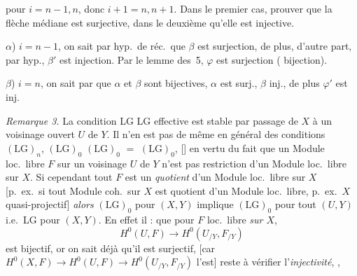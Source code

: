 \documentclass[11pt,a4paper]{article}
\begin{document}

pour $i = n-1, n$, donc $i+1 = n, n+1$. Dans le premier cas,  \ill{} prouver que la flèche médiane est surjective, dans le deuxième qu'elle est injective.

$\alpha$) $i = n-1$, on sait par hyp.\ de réc.\ que  $\beta$ est surjection,  de plus, d'autre part, par hyp., $\beta'$ est injection. Par le lemme des~5, $\varphi$ est  surjection (\struck{\ill{}} bijection).

$\beta$) $i = n$, on sait par   \ill{} que $\alpha$ et $\beta$ sont bijectives, \ill{} $\alpha$ est surj., $\beta$ inj., de plus $\varphi'$ est inj.

\emph{Remarque 3.} La condition LG \ill{} LG effective est stable par passage de $X$ à un voisinage ouvert $U$ de $Y$. Il n'en est pas de même en général des conditions $(\mathrm{LG})_n$,  $(\mathrm{LG})_0$ \struck{\ill{} \ill{} \ill{} \ill{} \ill{}} \ill{} \ill{} \ill{} \struck{\ill{} \ill{} \ill{}} $(\mathrm{LG})_0$ \ill{}  \ill{} $=$ \ill{} $(\mathrm{LG})_0$, [] en vertu du fait que un Module loc.\ libre $F$ sur un voisinage $U$ de $Y$ n'est \ill{} pas restriction d'un Module loc.\ libre sur  $X$. Si cependant tout $F$ \ill{} \ill{} est un \emph{quotient} d'un Module loc.\ libre sur $X$ [p.~ex.\ si tout Module coh.\ sur $X$ est quotient d'un Module loc.\ libre, p.~ex.\ $X$ quasi-projectif] \emph{alors} $(\mathrm{LG})_0$ pour $(X, Y)$ implique $(\mathrm{LG})_0$ pour tout $(U, Y)$ i.e.\ LG pour $(X, Y)$. En effet il  : \ill{}  que pour $F$ loc.\ libre \emph{sur $X$},
\[
  H^0(U, F) \longrightarrow H^0(U_{/Y}, F_{/Y})
\]
est bijectif, or on sait déjà qu'il est surjectif, [car $H^0(X, F) \to H^0(U, F) \to H^0(U_{/Y}, F_{/Y})$ l'est] reste à vérifier l'\emph{injectivité}, \struck{\ill{}},  
\end{document}
